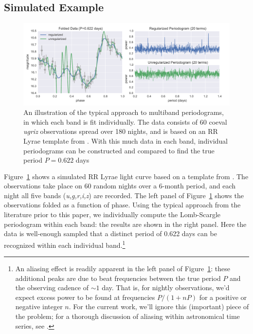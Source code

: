 \documentclass[12pt,preprint]{aastex}
\newcommand{\Fig}[1]{Figure~\ref{fig:#1}}
\newcommand{\fig}[1]{\Fig{#1}}
\newcommand{\figlabel}[1]{\label{fig:#1}}
\newcommand{\sectlabel}[1]{\label{sect:#1}}
\begin{document}
\subsection{Simulated Example}
\sectlabel{Simulated}

\begin{figure}
  \centering
  \includegraphics[width=\textwidth]{fig04.pdf}
  \caption{
    An illustration of the typical approach to multiband periodograms,
    in which each band is fit individually. The data consists of 60 coeval
    {\it ugriz} observations spread over 180 nights, and is based on an
    RR Lyrae template from \citet{Sesar2010}. With this much data in each
    band, individual periodograms can be constructed and compared to find the
    true period $P=0.622$ days
  }
  \figlabel{adhoc_example}
\end{figure}

\fig{adhoc_example} shows a simulated RR Lyrae light curve based on a template from \citet{Sesar2010}. The observations take place on 60 random nights over a 6-month period, and each night all five bands ({\it u,g,r,i,z}) are recorded. The left panel of \fig{adhoc_example} shows the observations folded as a function of phase.
Using the typical approach from the literature prior to this paper, we individually compute the Lomb-Scargle periodogram within each band: the results are shown in the right panel. Here the data is well-enough sampled that a distinct period of 0.622 days can be recognized within each individual band.\footnote{\label{foot1}
  An aliasing effect is readily apparent in the left panel of \fig{adhoc_example}: these additional peaks are due to beat frequencies between the true period $P$ and the observing cadence of $\sim 1$ day. That is, for nightly observations, we'd expect excess power to be found at frequencies $P / (1 + nP)$ for a positive or negative integer $n$. For the current work, we'll ignore this (important) piece of the problem; for a thorough discussion of aliasing within astronomical time series, see \citet{Roberts87}.}
\end{document}

